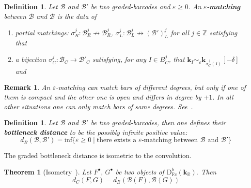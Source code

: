 \documentclass[a4paper, english, 11pt]{article}
\newcommand{\kk}[0]{\textbf{k}}
\newcommand{\0}{\vec{0}}
\newcommand{\R}[0]{\mathbb{R}}
\newcommand{\Z}[0]{\mathbb{Z}}
\newcommand{\B}[0]{\mathcal{B}}
\newcommand{\D}[0]{\text{D}}
\newtheorem{remark}[prop]{Remark}
\newtheorem{defi}[prop]{Definition}
\newtheorem{thm}[prop]{Theorem}
\begin{document}
\begin{defi}\label{D:Epsilonmatching}
Let $\B$ and $\B'$ be two graded-barcodes and $\varepsilon \geq 0$. An $\varepsilon$-\textbf{matching} between $\B$ and $\B$ is the data of
\begin{enumerate}
\item partial matchings: $\sigma_R^j: \B^j_R \not \to \B_R^j$, $\sigma_L^j: \B^j_L \not \to (\B')_L^j$ for all $j\in \Z$
satisfying that 
\item a \emph{bijection} $\sigma^j_C :  \B_C \longrightarrow \B'_C$ satisfying,  for any $I \in B^j_C $, that  $\kk_I \sim_\varepsilon \kk_{\sigma^j_C(I)}[-\delta]$ and
\end{enumerate}
\end{defi}
\begin{remark}
 An $\varepsilon$-matching can match bars of different degrees, but only if one of them is compact and  the other one is open and differs in degree by $+1$. In all other situations one can only match bars of same degrees. See~\cite{Berk18}.%
\end{remark}

\begin{defi}
Let $\B$ and $\B'$ be two graded-barcodes, then one defines their \textbf{bottleneck distance} to be the possibly infinite positive value: $$d_B(\B,\B') = \text{inf} \{\varepsilon \geq 0 \mid \text{there exists a } \varepsilon  \text{-matching between } \B \text{ and } \B' \} $$
\end{defi}
The graded bottleneck distance is isometric to the convolution.
\begin{thm}[Isometry~\cite{Berk18}]\label{T:DerivedIsometry}
Let $F^\bullet,\, G^\bullet$ be two objects of $\D^b_{\R c}(\kk_\R)$. Then 
$$ d_C(F,G) =  d_B(\B(F),\B(G))$$
\end{thm}
\end{document}
